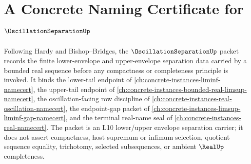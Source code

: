 \chapter{A Concrete Naming Certificate for $\OscillationSeparationUp$}
\label{ch:concrete-instances-oscillation-separation-namecert}

Following Hardy and Bishop--Bridges, the $\OscillationSeparationUp$ packet records the finite lower-envelope and upper-envelope separation data carried by a bounded real sequence before any compactness or completeness principle is invoked. It binds the lower-tail endpoint of \autoref{ch:concrete-instances-liminf-namecert}, the upper-tail endpoint of \autoref{ch:concrete-instances-bounded-real-limsup-namecert}, the oscillation-facing row discipline of \autoref{ch:concrete-instances-real-oscillation-namecert}, the endpoint-gap packet of \autoref{ch:concrete-instances-limsup-liminf-gap-namecert}, and the terminal real-name seal of \autoref{ch:concrete-instances-real-namecert}. The packet is an L10 lower/upper envelope separation carrier; it does not assert compactness, host supremum or infimum selection, quotient sequence equality, trichotomy, selected subsequences, or ambient $\RealUp$ completeness.

